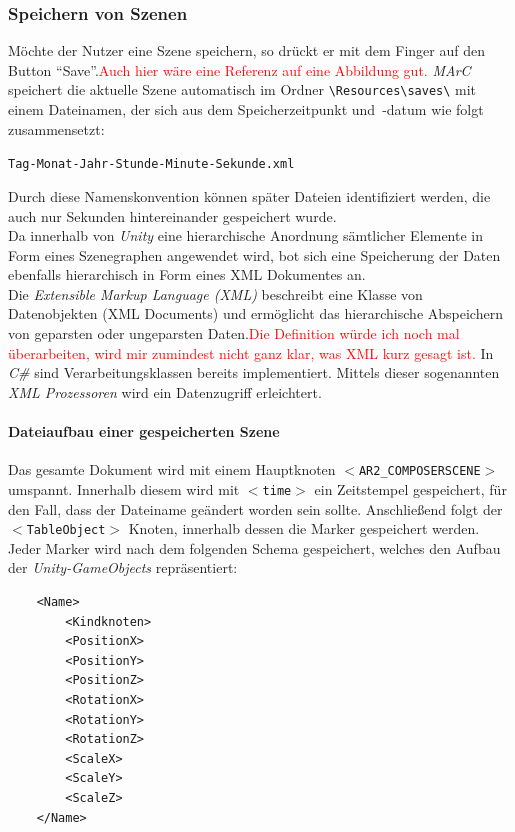 \subsubsection{Speichern von Szenen}\label{Speichern}
Möchte der Nutzer eine Szene speichern, so drückt er mit dem Finger auf den Button "`Save"'.\textcolor{red}{Auch hier wäre eine Referenz auf eine Abbildung gut.} \textit{MArC} speichert die aktuelle Szene automatisch im Ordner \texttt{\textbackslash Resources\textbackslash saves\textbackslash} mit einem Dateinamen, der sich aus dem Speicherzeitpunkt und~-datum wie folgt zusammensetzt:
\begin{center}
	\texttt{Tag-Monat-Jahr-Stunde-Minute-Sekunde.xml}
\end{center}
Durch diese Namenskonvention können später Dateien identifiziert werden, die auch nur Sekunden hintereinander gespeichert wurde.\\
Da innerhalb von \textit{Unity} eine hierarchische Anordnung sämtlicher Elemente in Form eines Szenegraphen angewendet wird, bot sich eine Speicherung der Daten ebenfalls hierarchisch in Form eines XML Dokumentes an.\\
Die \textit{Extensible Markup Language (XML)} beschreibt eine Klasse von Datenobjekten (XML Documents) und ermöglicht das hierarchische Abspeichern von geparsten oder ungeparsten Daten.\textcolor{red}{Die Definition würde ich noch mal überarbeiten, wird mir zumindest nicht ganz klar, was XML kurz gesagt ist.} \cite{bray1998extensible} In \textit{C\#} sind Verarbeitungsklassen bereits implementiert. Mittels dieser sogenannten \textit{XML Prozessoren} wird ein Datenzugriff erleichtert.

\paragraph{Dateiaufbau einer gespeicherten Szene}
Das gesamte Dokument wird mit einem Hauptknoten \texttt{$<$AR2\_COMPOSERSCENE$>$} umspannt. Innerhalb diesem wird mit \texttt{$<$time$>$}
ein Zeitstempel gespeichert, für den Fall, dass der Dateiname geändert worden sein sollte.
Anschließend folgt der \texttt{$<$TableObject$>$} Knoten, innerhalb dessen die Marker gespeichert werden. Jeder Marker wird nach dem folgenden Schema gespeichert, welches den Aufbau der \emph{Unity-GameObjects} repräsentiert:

 \begin{lstlisting}
	<Name>
		<Kindknoten>
		<PositionX>
		<PositionY>
		<PositionZ>
		<RotationX>
		<RotationY>
		<RotationZ>
		<ScaleX>
		<ScaleY>
		<ScaleZ>
	</Name>
 \end{lstlisting}

